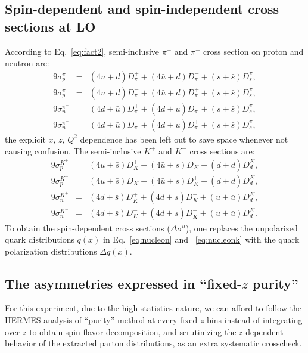 \subsection{Spin-dependent and spin-independent cross sections at LO} 
According to Eq.~\ref{eq:fact2}, semi-inclusive  $\pi^{+}$ and $\pi^{-}$ cross section
 on proton and neutron are: 
\begin{eqnarray}  
 9 \sigma_p^{\pi^+} & = & (4 u+\bar{d})D_{\pi}^+ 
 + (4 {\bar u}+ d)D_{\pi}^- + (s+\bar{s}) D_s^{\pi}, \nonumber \\ 
 9 \sigma_p^{\pi^-} & = & (4 u+\bar{d})D_{\pi}^- 
 + (4 {\bar u}+ d)D_{\pi}^+ + (s+\bar{s}) D_s^{\pi}, \nonumber \\ 
 9 \sigma_n^{\pi^+} & = & (4 d+\bar{u})D_{\pi}^+ 
 + (4 {\bar d}+ u)D_{\pi}^- + (s+\bar{s}) D_s^{\pi}, \nonumber \\ 
 9 \sigma_n^{\pi^-} & = & (4 d+\bar{u})D_{\pi}^- 
 + (4 {\bar d}+ u)D_{\pi}^+ + (s+\bar{s}) D_s^{\pi},  
\label{eq:nucleon}  
\end{eqnarray}  
the explicit $x$, $z$, $Q^2$ dependence has been left out to save space whenever
not causing confusion.  
The semi-inclusive  $K^{+}$ and $K^{-}$ cross sections are: 
\begin{eqnarray}  
 9\sigma_p^{K^+} & = & (4 u+ \bar{s})D_{K}^+ 
 + (4 {\bar u}+ s)D_{K}^- + (d +\bar{d}) D_d^{K}, \nonumber \\ 
 9\sigma_p^{K^-} & = & (4 u+ \bar{s})D_{K}^- 
 + (4 {\bar u}+ s)D_{K}^+ + (d +\bar{d}) D_d^{K}, \nonumber \\ 
 9\sigma_n^{K^+} & = & (4 d+ \bar{s})D_{K}^+ 
 + (4 {\bar d}+ s)D_{K}^- + (u +\bar{u}) D_d^{K}, \nonumber \\ 
 9\sigma_n^{K^-} & = & (4 d+ \bar{s})D_{K}^- 
 + (4 {\bar d}+ s)D_{K}^+ + (u +\bar{u}) D_d^{K}. 
\label{eq:nucleonk}  
\end{eqnarray}  
To obtain the spin-dependent cross sections ($\Delta \sigma^h$), one   
replaces the unpolarized quark distributions $q(x)$ in Eq.~\ref{eq:nucleon} and ~\ref{eq:nucleonk} 
with the quark polarization distributions $\Delta q(x)$.

\subsection{The asymmetries expressed in  ``fixed-$z$ purity''} 

For this experiment,   due to the high statistics nature, we can afford to follow the HERMES analysis of  ``purity'' method at every fixed $z$-bins instead of integrating over  $z$ to obtain spin-flavor decomposition, and scrutinizing the $z$-dependent behavior of the extracted parton distributions, as an extra systematic crosscheck.


